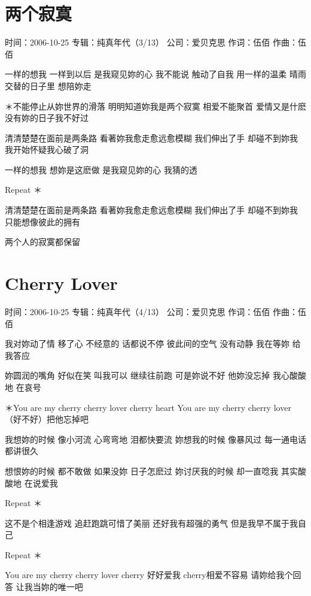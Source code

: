 \documentclass[UTF8,a4paper,oneside,twocolumn,12pt]{ctexbook}
\newcommand{\infopair}[2]{\textbullet #1：#2}
\newcommand{\zc}[1][伍佰]{\infopair{作词}{#1}}
\newcommand{\zq}[1][伍佰]{\infopair{作曲}{#1}}
\newcommand{\zj}[1]{\infopair{专辑}{#1}}
\newcommand{\sj}[1]{\infopair{时间}{#1}}
\newcommand{\gs}[1]{\infopair{公司}{#1}}
\newenvironment{info}{\begin{flushleft}\kaishu
	}
	{\end{flushleft}\normalsize\yahei\par}
\newenvironment{lyric}{
	}
{}
\begin{document}
\section{两个寂寞}
\begin{info}
	\sj{2006-10-25}
	\zj{纯真年代（3/13）}
	\gs{爱贝克思}
	\zc
	\zq
\end{info}
\begin{lyric}
	一样的想我 一样到以后 是我窥见妳的心 我不能说
	触动了自我 用一样的温柔 晴雨交替的日子里 想陪妳走

	＊不能停止从妳世界的滑落 明明知道妳我是两个寂寞
	相爱不能聚首 爱情又是什麽 没有妳的日子我不好过

	清清楚楚在面前是两条路 看著妳我愈走愈远愈模糊
	我们伸出了手 却碰不到妳我 我开始怀疑我心破了洞

	一样的想我 想妳是这麽做 是我窥见妳的心 我猜的透

	Repeat ＊

	清清楚楚在面前是两条路 看著妳我愈走愈远愈模糊
	我们伸出了手 却碰不到妳我 只能想像彼此的拥有

	两个人的寂寞都保留
\end{lyric}

\section{Cherry Lover}
\begin{info}
	\sj{2006-10-25}
	\zj{纯真年代（4/13）}
	\gs{爱贝克思}
	\zc
	\zq
\end{info}
\begin{lyric}
	我对妳动了情 移了心 不经意的 话都说不停
	彼此间的空气 没有动静 我在等妳 给我答应

	妳圆润的嘴角 好似在笑 叫我可以 继续往前跑
	可是妳说不好 他妳没忘掉 我心酸酸地 在哀号

	＊You are my cherry cherry lover cherry heart
	You are my cherry cherry lover （好不好）把他忘掉吧

	我想妳的时候 像小河流 心弯弯地 泪都快要流
	妳想我的时候 像暴风过 每一通电话 都讲很久

	想恨妳的时候 都不敢做 如果没妳 日子怎麽过
	妳讨厌我的时候 却一直唸我 其实酸酸地 在说爱我

	Repeat ＊

	这不是个相逢游戏 追赶跑跳可惜了美丽
	还好我有超强的勇气 但是我早不属于我自己

	Repeat ＊

	You are my cherry cherry lover cherry 好好爱我
	cherry相爱不容易 请妳给我个回答 让我当妳的唯一吧
\end{lyric}
\end{document}
